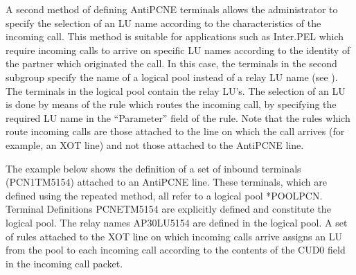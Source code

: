 \documentclass[letterpaper,10pt,english]{sphinxmanual}
\begin{document}
\sphinxAtStartPar
{}

\sphinxAtStartPar
A second method of defining AntiPCNE terminals allows the administrator to specify the selection of an LU name according to the characteristics of the incoming call. This method is suitable for applications such as Inter.PEL which require incoming calls to arrive on specific LU names according to the identity of the partner which originated the call. In this case, the terminals in the second sub\sphinxhyphen{}group specify the name of a logical pool instead of a relay LU name (see {\hyperref[\detokenize{connectivity_guide:v461cn-logicalpool}]{}}). The terminals in the logical pool contain the relay LU’s. The selection of an LU is done by means of the rule which routes the incoming call, by specifying the required LU name in the “Parameter” field of the rule. Note that the rules which route incoming calls are those attached to the line on which the call arrives (for example, an XOT line) and not those attached to the AntiPCNE line.

\sphinxAtStartPar
The example below shows the definition of a set of inbound terminals (PCN1TM51\sphinxhyphen{}54) attached to an AntiPCNE line. These terminals, which are defined using the repeated method, all refer to a logical pool *POOLPCN. Terminal Definitions PCNETM51\sphinxhyphen{}54 are explicitly defined and constitute the logical pool. The relay names AP30LU51\sphinxhyphen{}54 are defined in the logical pool. A set of rules attached to the XOT line on which incoming calls arrive assigns an LU from the pool to each incoming call according to the contents of the CUD0 field in the incoming call packet.
\end{document}
